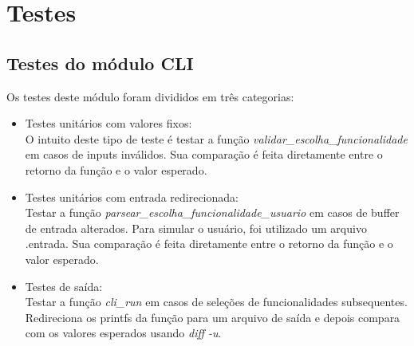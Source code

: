 \documentclass[12pt,a4paper]{article}
\begin{document}
\section{Testes}\label{sec:testes}

\subsection{Testes do módulo \textbf{CLI}}\label{subsec:testes_cli}
Os testes deste módulo foram divididos em três categorias:

\begin{itemize}
  \item Testes unitários com valores fixos: \\
  O intuito deste tipo de teste é testar a função \emph{validar\_escolha\_funcionalidade} em casos de 
  inputs inválidos. Sua comparação é feita diretamente entre o retorno da função e o valor esperado.

  \item Testes unitários com entrada redirecionada: \\
  Testar a função \emph{parsear\_escolha\_funcionalidade\_usuario} em casos de buffer de entrada alterados.
  Para simular o usuário, foi utilizado um arquivo .entrada. Sua comparação é feita diretamente entre o retorno da
  função e o valor esperado.

  \item Testes de saída: \\
  Testar a função \emph{cli\_run} em casos de seleções de funcionalidades subsequentes.
  Redireciona os printfs da função para um arquivo de saída e depois compara com os valores esperados usando \emph{diff -u}.
\end{itemize}
\end{document}
